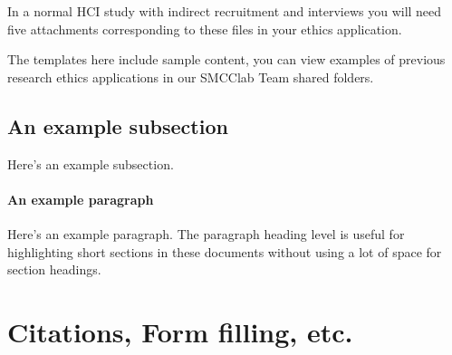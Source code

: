 \documentclass[11pt, a4paper, oneside]{article}
\begin{document}
In a normal HCI study with indirect recruitment and interviews you will need five attachments corresponding to these files in your ethics application.

The templates here include sample content, you can view examples of previous research ethics applications in our SMCClab Team shared folders.

\subsection{An example subsection}

Here's an example subsection.

\paragraph{An example paragraph}

Here's an example paragraph. The paragraph heading level is useful for highlighting short sections in these documents without using a lot of space for section headings.

\section{Citations, Form filling, etc.}
\end{document}
